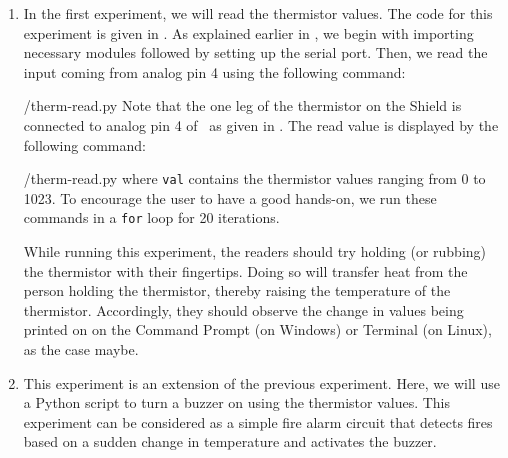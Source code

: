\begin{enumerate}
  \item In the first experiment, we will read the thermistor values.
        The code for this experiment is given in .
        As explained earlier in , we begin with
        importing necessary modules followed by setting up the serial port.
        Then, we read the input coming from analog pin 4 using the
        following command:
        
        {\LocTHERMpycode/therm-read.py} Note that the one leg of the thermistor on
        the Shield is connected to analog pin 4 of \arduino\,
        as given in . The read value is displayed
        by the following command:
        
        {\LocTHERMpycode/therm-read.py} where {\tt val} contains
        the thermistor values ranging from 0 to 1023. To
        encourage the user to have a good hands-on, we run these commands in
        a {\tt for} loop for 20 iterations.

        While running this experiment,
        the readers should try holding (or rubbing) the thermistor with their fingertips.
        Doing so will transfer heat from the person holding the
        thermistor, thereby raising the temperature of the thermistor.
        Accordingly, they should observe the change in values being printed on on the
        Command Prompt (on Windows) or Terminal (on Linux), as the case maybe.


  \item This experiment is an extension of the previous
        experiment. Here, we will use a Python script to
        turn a buzzer on using the thermistor values. This experiment
        can be considered as a simple fire alarm circuit that
        detects fires based on a sudden change in temperature and
        activates the buzzer.


\end{enumerate}
